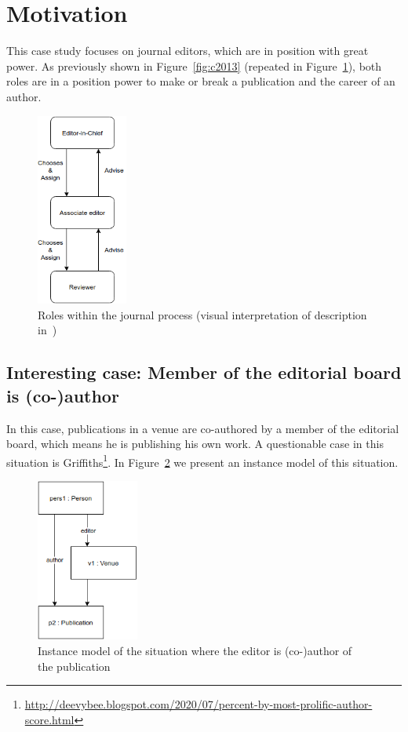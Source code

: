 \documentclass{ou-report}
\begin{document}
\section{Motivation}
This case study focuses on journal editors, which are in position with great 
power. As previously shown in Figure~\ref{fig:c2013} (repeated in 
Figure~\ref{fig:c2013_2}), both roles are in a position power to make or break 
a publication and the career of an author.

\begin{figure}[H]
\centering
\includegraphics[width=3cm]{images/c2013.drawio.png}
\caption{Roles within the journal process (visual interpretation of description in~\cite{C2013})}
\label{fig:c2013_2}
\end{figure}

\newpage

\subsection{Interesting case: Member of the editorial board is (co-)author}
\label{interesting_case:member_editorial_board_is_coauthor}

In this case, publications in a venue are co-authored by a member of the 
editorial board, which means he is publishing his own work. A questionable 
case in this situation is
\mbox{Griffiths}\footnote{\url{http://deevybee.blogspot.com/2020/07/percent-by-most-prolific-author-score.html}}.
In Figure~\ref{fig:eia} we present an instance model of this situation.

\begin{figure}
    \centering
    \includegraphics[width=0.3\textwidth]{images/editor_is_author.drawio.png}
    \caption{Instance model of the situation where the editor is \mbox{(co-)author} of the publication}
    \label{fig:eia}
\end{figure}
\end{document}
